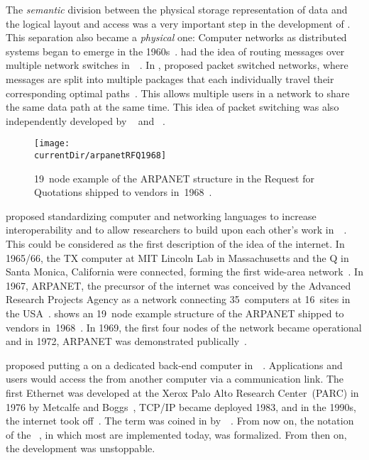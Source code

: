The \emph{semantic} division between the physical storage representation of data and the logical layout and access was a very important step in the development of .
This separation also became a \emph{physical} one:
Computer networks as distributed systems began to emerge in the 1960s~\cite{KR2020CNATDA}.
 had the idea of routing messages over multiple network switches in~\citeyear{B1960OADCACSC}~\cite{B1964ODCIITDCN,B1964ODCVHAAAC,B1965ABOTDAMBN,B1960OADCACSC,B1962ODCN}.
In \citeyear{K1961IFILCNPTP}, \citeauthor{K1961IFILCNPTP} proposed packet switched networks, where messages are split into multiple packages that each individually travel their corresponding optimal paths~\cite{K1961IFILCNPTP}.
This allows multiple users in a network to share the same data path at the same time.
This idea of packet switching was also independently developed by \citeauthor{B1962ODCN}~\cite{B1962ODCN} and \citeauthor{D1965ROLDPAICN}~\cite{D1965ROLDPAICN,D1965PFTDOANCSFOLDP,D1966PFADCN}.

\begin{figure}%
\centering%
\texttt{[image: \\currentDir/arpanetRFQ1968]}%
\caption{19~node example of the ARPANET structure in the Request for Quotations shipped to vendors in~1968~\cite{K2010AEHOTIHOC}.}%
\label{fig:arpanetRFQ1968}%
\end{figure}%

 proposed standardizing computer and networking languages to increase interoperability and to allow researchers to build upon each other's work in~\citeyear{L1963MFMAAOTICN}~\cite{L1963MFMAAOTICN}.
This could be considered as the first description of the idea of the internet.
In 1965/66, the TX computer at MIT Lincoln Lab in Massachusetts and the Q in Santa Monica, California were connected, forming the first wide-area network~\cite{L1986TAACN}.
In 1967, ARPANET, the precursor of the internet was conceived by the Advanced Research Projects Agency as a network connecting 35~computers at 16~sites in the USA~\cite{L1986TAACN,KR2020CNATDA}.
 shows an 19~node example structure of the ARPANET shipped to vendors in~1968~\cite{K2010AEHOTIHOC}.
In 1969, the first four nodes of the network became operational and in 1972, ARPANET was demonstrated publically~\cite{L1986TAACN,KR2020CNATDA}.

 proposed putting a  on a dedicated back-end computer in~\citeyear{CHIRW1974ABECFDBM}~\cite{CHIRW1974ABECFDBM}.
Applications and users would access the  from another computer via a communication link.
The first Ethernet was developed at the Xerox Palo Alto Research Center~(PARC) in 1976 by Metcalfe and Boggs~\cite{CHM1996CLN}, TCP/IP became deployed 1983, and in the 1990s, the internet took off~\cite{KR2020CNATDA}.
The term  was coined in \citeyear{IMS1978SDFFIADFS} by~\citeauthor{IMS1978SDFFIADFS}~\cite{IMS1978SDFFIADFS}.
From now on, the notation of the ~\cite{RCKS2019PNP,B1996CSA,OHE1999CSSG,RF2020FOSAAEA,EOEBEB:CSA}, in which most  are implemented today, was formalized.
From then on, the development was unstoppable.

